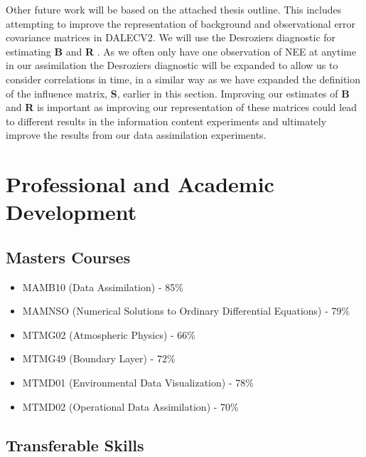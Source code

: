 \documentclass[11pt]{article}
\begin{document}
Other future work will be based on the attached thesis outline. This includes attempting to improve the representation of background and observational error covariance matrices in DALECV2. We will use the Desroziers diagnostic for estimating \textbf{B} and \textbf{R} \citep{desroziers2005diagnosis}. As we often only have one observation of NEE at anytime in our assimilation the Desroziers diagnostic will be expanded to allow us to consider correlations in time, in a similar way as we have expanded the definition of the influence matrix, \textbf{S}, earlier in this section. Improving our estimates of \textbf{B} and \textbf{R} is important as improving our representation of these matrices could lead to different results in the information content experiments and ultimately improve the results from our data assimilation experiments. 



\section{Professional and Academic Development}

\subsection{Masters Courses}
\begin{itemize}
\item MAMB10 (Data Assimilation) - 85\%
\item MAMNSO (Numerical Solutions to Ordinary Differential Equations) - 79\%
\item MTMG02 (Atmospheric Physics) - 66\%
\item MTMG49 (Boundary Layer) - 72\%
\item MTMD01 (Environmental Data Visualization) - 78\%
\item MTMD02 (Operational Data Assimilation) - 70\%
\end{itemize}

\subsection{Transferable Skills}
\end{document}
